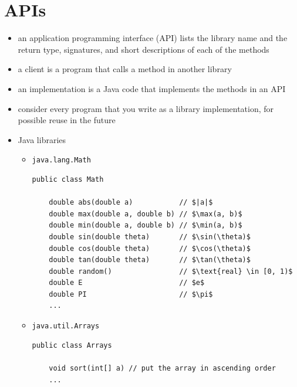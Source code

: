 \documentclass[8pt,a4paper,compress]{beamer}
\begin{document}
\section{APIs}
\begin{frame}[fragile]
\begin{itemize}
\item an application programming interface (API) lists the library name and the return type, signatures, and short descriptions of each of the methods

\item a client is a program that calls a method in another library

\item an implementation is a Java code that implements the methods in an API

\item consider every program that you write as a library implementation, for possible reuse in the future

\item Java libraries
\begin{itemize}
\item \lstinline{java.lang.Math}
\begin{lstlisting}[language={},mathescape]
public class Math

    double abs(double a)           // $|a|$
    double max(double a, double b) // $\max(a, b)$
    double min(double a, double b) // $\min(a, b)$
    double sin(double theta)       // $\sin(\theta)$
    double cos(double theta)       // $\cos(\theta)$
    double tan(double theta)       // $\tan(\theta)$
    double random()                // $\text{real} \in [0, 1)$
    double E                       // $e$
    double PI                      // $\pi$
    ...
\end{lstlisting}

\item \lstinline{java.util.Arrays}
\begin{lstlisting}[language={}]
public class Arrays

    void sort(int[] a) // put the array in ascending order
    ...
\end{lstlisting}
\end{itemize}
\end{itemize}
\end{frame}
\end{document}
